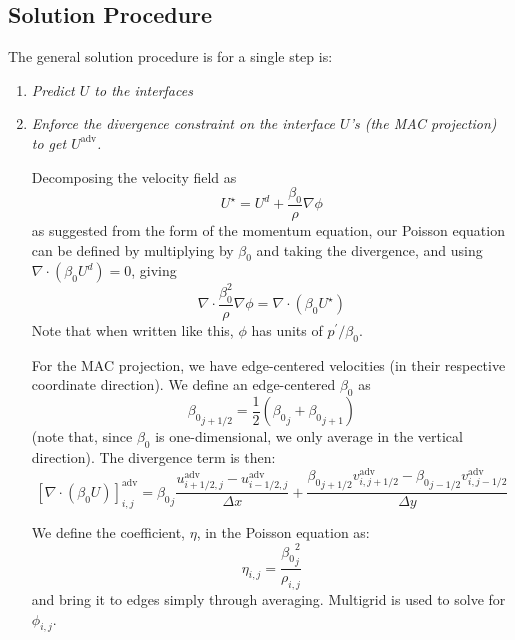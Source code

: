   
\subsection{Solution Procedure}

The general solution procedure is for a single step is:
\begin{enumerate}
  \renewcommand{\labelenumi}{\Roman{enumi}.}
  
\item {\em Predict $U$ to the interfaces}

\item {\em Enforce the divergence constraint on the interface $U$'s (the
  MAC projection) to get $U^\mathrm{adv}$.}

  Decomposing the velocity field as
  \begin{equation}
    U^\star = U^d + \frac{\beta_0}{\rho} \nabla \phi
  \end{equation}
  as suggested from the form of the momentum equation, our Poisson
  equation can be defined by multiplying by $\beta_0$ and taking the
  divergence, and using $\nabla \cdot (\beta_0 U^d) = 0$, giving
  \begin{equation}
    \nabla \cdot \frac{\beta_0^2}{\rho} \nabla \phi =
    \nabla \cdot (\beta_0 U^\star)
  \end{equation}
  Note that when written like this, $\phi$ has units of
  $p^\prime/\beta_0$. 
  
  For the MAC projection, we have edge-centered velocities (in their
  respective coordinate direction).  We define an edge-centered $\beta_0$ as
  \begin{equation}
    {\beta_0}_{j+1/2} = \frac{1}{2} ( {\beta_0}_j + {\beta_0}_{j+1} )
  \end{equation}
  (note that, since $\beta_0$ is one-dimensional, we only average in
  the vertical direction).  The divergence term is then:
  \begin{equation}
    \left [ \nabla \cdot (\beta_0 U) \right ]_{i,j}^\mathrm{adv} =
          {\beta_0}_j \frac{u^\mathrm{adv}_{i+1/2,j} - 
            u^\mathrm{adv}_{i-1/2,j}}{\Delta x} +
          \frac{{\beta_0}_{j+1/2} v^\mathrm{adv}_{i,j+1/2} - 
            {\beta_0}_{j-1/2} v^\mathrm{adv}_{i,j-1/2} }{\Delta y}
  \end{equation}
  
  We define the coefficient, $\eta$, in the Poisson equation as:
  \begin{equation}
    \eta_{i,j} = \frac{{\beta_0}_j^2}{\rho_{i,j}}
  \end{equation}
  and bring it to edges simply through averaging.  Multigrid is
  used to solve for $\phi_{i,j}$.


\end{enumerate}
